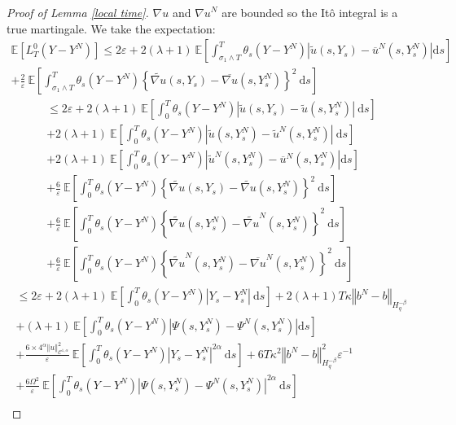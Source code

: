 \documentclass[11pt]{article}
\newcommand{\norme}[1]{\left\Vert #1\right\Vert}
\newcommand{\E}{\mathbb{E}}
\newcommand{\di}{\mathrm{d}}
\begin{document}
\begin{proof}[Proof of Lemma \ref{local time}]
    ${\nabla u}$ and ${\nabla u}^N$ are bounded so the Itô integral is a true martingale. We take the expectation:
    \begin{multline*}
    \E\left[L^0_T(Y-Y^N)\right] \leq 2\varepsilon + 2(\lambda + 1)\ \E\left[\int_{\sigma_1\wedge T}^T\theta_s\left(Y-Y^N\right)\left|\widetilde{u}\left(s,Y_s\right)-\overline{u}^N\left(s,Y_s^N\right)\right| \di s \right]\\
    +\frac{2}{\varepsilon}\ \E\left[\int_{\sigma_1\wedge T}^T \theta_s\left(Y-Y^N\right)\left\{\widetilde{\nabla u}\left(s,Y_s\right)-{\overline{\nabla u}}\left(s,Y_s^N\right)\right\}^2\ \di s\right]
    \end{multline*}
    \begin{multline*}
    \leq 2\varepsilon + 2(\lambda + 1)\ \E\left[\int_0^T\theta_s\left(Y-Y^N\right)\left|\widetilde{u}\left(s,Y_s\right)-\widetilde{u}\left(s,Y_s^N\right)\right|\ \di s \right]\\+2(\lambda + 1)\ \E\left[\int_0^T\theta_s\left(Y-Y^N\right)\left|\widetilde{u}\left(s,Y_s^N\right)-\widetilde{u}^N\left(s,Y_s^N\right)\right|\ \di s \right]\\+ 2(\lambda + 1)\ \E\left[\int_{0}^T\theta_s\left(Y-Y^N\right)\left|\widetilde{u}^N\left(s,Y_s^N\right)-\overline{u}^N\left(s,Y_s^N\right)\right| \di s \right]\\
    +\frac{6}{\varepsilon}\ \E\left[\int_0^T \theta_s\left(Y-Y^N\right)\left\{\widetilde{\nabla u}\left(s,Y_s\right)-\widetilde{\nabla u}\left(s,Y_s^N\right)\right\}^2\ \di s\right]\\
    +\frac{6}{\varepsilon}\ \E\left[\int_0^T \theta_s\left(Y-Y^N\right)\left\{\widetilde{\nabla u}\left(s,Y_s^N\right)-\widetilde{\nabla u}^N\left(s,Y_s^N\right)\right\}^2\ \di s\right]\\
    +\frac{6}{\varepsilon}\ \E\left[\int_{0}^T \theta_s\left(Y-Y^N\right)\left\{\widetilde{\nabla u}^N\left(s,Y_s^N\right)-{\overline{\nabla u}^N}\left(s,Y_s^N\right)\right\}^2\ \di s\right]
    \end{multline*}
    \begin{multline*}
    \leq 2\varepsilon + 2(\lambda + 1)\ \E\left[\int_0^T\theta_s\left(Y-Y^N\right)\left|Y_s - Y^N_s\right|\ \di s \right] + 2(\lambda + 1)T\kappa\norme{b^N-b}_{H^{-\beta}_{q}} \\
    + (\lambda + 1)\ \E\left[\int_{0}^T\theta_s\left(Y-Y^N\right)\left|\Psi\left(s,Y_s^N\right)-\Psi^N\left(s,Y_s^N\right)\right| \di s \right]\\  
    +\frac{6\times4^{\alpha}\norme{u}_{\mathcal{C}^{1,\alpha}}^2}{\varepsilon}\ \E\left[\int_0^T \theta_s\left(Y-Y^N\right)\left|Y_s - Y^N_s\right|^{2\alpha}\ \di s\right]  + 6T\kappa^2\norme{b^N-b}_{H^{-\beta}_{q}}^2\varepsilon^{-1} \\+\frac{6\Omega^2}{\varepsilon}\ \E\left[\int_{0}^T \theta_s\left(Y-Y^N\right)\left|\Psi\left(s,Y_s^N\right)-{\Psi^N}\left(s,Y_s^N\right)\right|^{2\alpha}\ \di s\right]\\

\end{multline*}
\end{proof}
\end{document}
